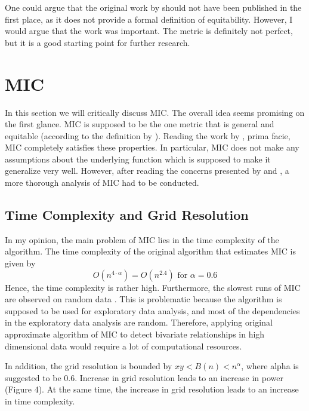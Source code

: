 \documentclass{article}
\begin{document}
One could argue that the original work by \cite{reshef2011} should not have been published in the first place, as it does not provide a formal definition of equitability. However, I would argue that the work was important. The metric is definitely not perfect, but it is a good starting point for further research. 

\section{MIC}
In this section we will critically discuss MIC. The overall idea seems promising on the first glance. MIC is supposed to be the one metric that is general and equitable (according to the definition by \cite{reshef2011}). Reading the work by \cite{reshef2011}, prima facie, MIC completely satisfies these properties. In particular, MIC does not make any assumptions about the underlying function which is supposed to make it generalize very well. However, after reading the concerns presented by \cite{simon2014} and \cite{kinney2014}, a more thorough analysis of MIC had to be conducted.


\subsection{Time Complexity and Grid Resolution}
In my opinion, the main problem of MIC lies in the time complexity of the algorithm. The time complexity of the original algorithm that estimates MIC \citep{reshef2011} is given by
\[
    O(n^{4\cdot\alpha}) = O(n^{2.4}) \text{ for } \alpha = 0.6
\]
Hence, the time complexity is rather high. Furthermore, the slowest runs of MIC are observed on random data \citep{shao2021}. This is problematic because the algorithm is supposed to be used for exploratory data analysis, and most of the dependencies in the exploratory data analysis are random. Therefore, applying original approximate algorithm of MIC
to detect bivariate relationships in high dimensional data would require a lot of computational resources.

In addition, the grid resolution is bounded by $xy < B(n) < n^\alpha$, where alpha is suggested to be $0.6$. Increase in grid resolution leads to an increase in power \citep{cao2021} (Figure 4). At the same time, the increase in grid resolution leads to an increase in time complexity.
\end{document}
